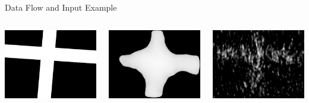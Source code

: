 \documentclass{beamer}
\begin{document}
\begin{frame}{Data Flow and Input Example}
\begin{columns}
\includegraphics[width=0.95\linewidth]{target_x.jpg}

\includegraphics[width=0.95\linewidth]{pred_x.png}

\includegraphics[width=0.95\linewidth]{QCI_x.jpg}


\end{columns}
\end{frame}
\end{document}
